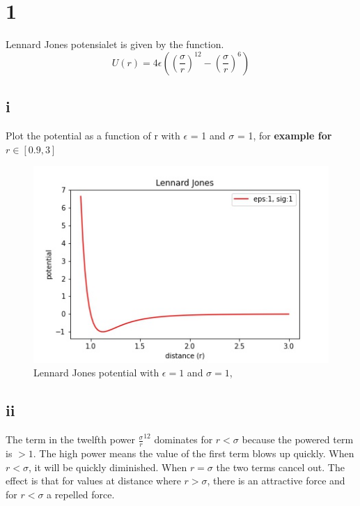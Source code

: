 
\section*{1}
Lennard Jones potensialet is given by the function.
\begin{equation}
U(r) = 4\epsilon \left(   (\frac{\sigma}{r})^{12} -   (\frac{\sigma}{r})^6 \right)
\end{equation}

\subsection*{i}
Plot the potential as a function of r with $\epsilon$ = 1 and $\sigma$ = 1, for \textbf{example for $r \in [0.9, 3]$}
\begin{figure}[h!]
        \centering 
        \includegraphics[scale=0.6]{1a_i.jpg} 
        \caption{Lennard Jones potential with $\epsilon = 1$ and $\sigma = 1$, }
        \label{fig:eksempelbilde1}
\end{figure}

\subsection*{ii}

The term in the twelfth power $\frac{\sigma}{r}^12$ dominates for $r < \sigma$ because the powered term is $ > 1$. The high power means the value of the first term blows up quickly. When $r < \sigma$, it will be quickly diminished. When $r = \sigma$ the two terms cancel out. The effect is that for values at distance where $r > \sigma$, there is an attractive force and for $r < \sigma$ a repelled force.

